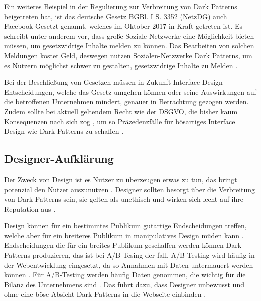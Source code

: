 \documentclass[conference,compsoc,final,a4paper]{IEEEtran}
\begin{document}
Ein weiteres Beispiel in der Regulierung zur Verbreitung von Dark Patterns beigetreten hat, ist das deutsche Gesetz BGBl. I S. 3352 (\ac{NetzDG}) auch Facebook-Gesetzt genannt, welches im Oktober 2017 in Kraft getreten ist. Es schreibt unter anderem vor, dass große Soziale-Netzwerke eine Möglichkeit bieten müssen, um gesetzwidrige Inhalte melden zu können. Das Bearbeiten von solchen Meldungen kostet Geld, deswegen nutzen Sozialen-Netzwerke Dark Patterns, um es Nutzern möglichst schwer zu gestalten, gesetzwidrige Inhalte zu Melden \autocite{Rieger2020}.


Bei der Beschließung von Gesetzen müssen in Zukunft Interface Design Entscheidungen, welche das Gesetz umgehen können oder seine Auswirkungen auf die betroffenen Unternehmen mindert, genauer in Betrachtung gezogen werden. Zudem sollte bei aktuell geltendem Recht wie der \ac{DSGVO}, die bisher kaum Konsequenzen nach sich zog \autocite{Nouwens2020}, um so Präzedenzfälle für bösartiges Interface Design wie Dark Patterns zu schaffen \autocite{Rieger2020}.

\subsection{Designer-Aufklärung}
Der Zweck von Design ist es Nutzer zu überzeugen etwas zu tun, das bringt potenzial den Nutzer auszunutzen \autocites{OinasKukkonen2009}{Sengers2005}. Designer sollten besorgt über die Verbreitung von Dark Patterns sein, sie gelten als unethisch und wirken sich lecht auf ihre Reputation aus \autocite{Narayanan2020}.

Design können für ein bestimmtes Publikum gutartige Endscheidungen treffen, welche aber für ein breiteres Publikum in manipulatives Design müden kann \autocite{Gray_2018}. Endscheidungen die für ein breites Publikum geschaffen werden können Dark Patterns produzieren, das ist bei A/B-Tesing der fall. A/B-Testing wird häufig in der Webentwicklung eingesetzt, da so Annahmen mit Daten untermauert werden können \autocite{Kohavi2017}. Für A/B-Testing werden häufig Daten genommen, die wichtig für die Bilanz des Unternehmens sind \autocites{Kohavi2017}{Narayanan2020}. Das führt dazu, dass Designer unbewusst und ohne eine böse Absicht Dark Patterns in die Webseite einbinden \autocite{Narayanan2020}.
\end{document}
